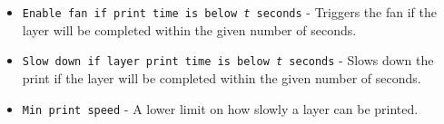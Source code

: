 \begin{itemize}
	\item \texttt{Enable fan if print time is below \textit{t} seconds}  - Triggers the fan if the layer will be completed within the given number of seconds.
	\item \texttt{Slow down if layer print time is below \textit{t} seconds}  - Slows down the print if the layer will be completed within the given number of seconds.
	\item \texttt{Min print speed}  - A lower limit on how slowly a layer can be printed. 
\end{itemize}



